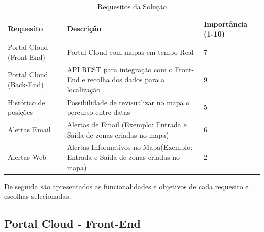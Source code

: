 \begin{table}[htb]
\centering
\caption{Requesitos da Solução}\label{tab1}
\begin{tabular}{|p{3cm}|p{8cm}|p{2cm}|}\hline
Requesito&Descrição&Importância (1-10)\\\hline

Portal Cloud (Front-End)&Portal Cloud com mapas em tempo Real& 7\\\hline
Portal Cloud (Back-End) & API REST para integração com o Front-End e recolha dos dados para a localização &9\\\hline
Histórico de posições&Possibilidade de revisualizar no mapa o percurso entre datas&5\\\hline
Alertas Email&Alertas de Email (Exemplo: Entrada e Saída de zonas criadas no mapa)&6\\\hline
Alertas Web&Alertas Informativos no Mapa(Exemplo: Entrada e Saída de zonas criadas no mapa)&2\\\hline
\end{tabular} 
\end{table}

\par
De seguida são apresentados as funcionalidades e objetivos de cada requesito e escolhas selecionadas.

\subsection {Portal Cloud -  Front-End}

